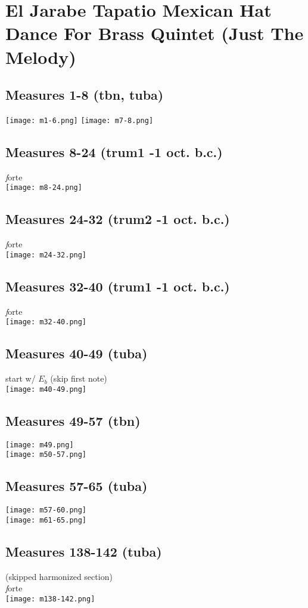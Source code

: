\documentclass[letterpaper]{article}
\begin{document}
\section*{El Jarabe Tapatio Mexican Hat Dance For Brass Quintet (Just The Melody)}
\subsection*{Measures 1-8 (tbn, tuba)}
\texttt{[image: m1-6.png]}
\texttt{[image: m7-8.png]}
\subsection*{Measures 8-24 (trum1 -1 oct. b.c.)}
\emph forte\\
\texttt{[image: m8-24.png]}

\subsection*{Measures 24-32 (trum2 -1 oct. b.c.)}
\emph forte\\
\texttt{[image: m24-32.png]}

\subsection*{Measures 32-40 (trum1 -1 oct. b.c.)}
\emph forte\\
\texttt{[image: m32-40.png]}

\subsection*{Measures 40-49 (tuba)}
start w/ $E_b$ (skip first note)\\
\texttt{[image: m40-49.png]}

\subsection*{Measures 49-57 (tbn)}
\texttt{[image: m49.png]}\\
\texttt{[image: m50-57.png]}


\subsection*{Measures 57-65 (tuba)}
\texttt{[image: m57-60.png]}\\
\texttt{[image: m61-65.png]}

\subsection*{Measures 138-142 (tuba)}
(skipped harmonized section)\\
\emph forte\\
\texttt{[image: m138-142.png]}
\end{document}
